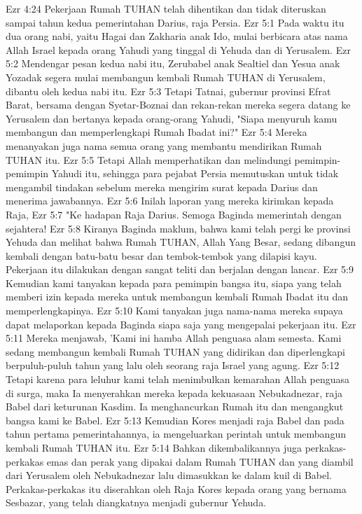 Ezr 4:24  Pekerjaan Rumah TUHAN telah dihentikan dan tidak diteruskan sampai tahun kedua pemerintahan Darius, raja Persia.
Ezr 5:1  Pada waktu itu dua orang nabi, yaitu Hagai dan Zakharia anak Ido, mulai berbicara atas nama Allah Israel kepada orang Yahudi yang tinggal di Yehuda dan di Yerusalem.
Ezr 5:2  Mendengar pesan kedua nabi itu, Zerubabel anak Sealtiel dan Yesua anak Yozadak segera mulai membangun kembali Rumah TUHAN di Yerusalem, dibantu oleh kedua nabi itu.
Ezr 5:3  Tetapi Tatnai, gubernur provinsi Efrat Barat, bersama dengan Syetar-Boznai dan rekan-rekan mereka segera datang ke Yerusalem dan bertanya kepada orang-orang Yahudi, "Siapa menyuruh kamu membangun dan memperlengkapi Rumah Ibadat ini?"
Ezr 5:4  Mereka menanyakan juga nama semua orang yang membantu mendirikan Rumah TUHAN itu.
Ezr 5:5  Tetapi Allah memperhatikan dan melindungi pemimpin-pemimpin Yahudi itu, sehingga para pejabat Persia memutuskan untuk tidak mengambil tindakan sebelum mereka mengirim surat kepada Darius dan menerima jawabannya.
Ezr 5:6  Inilah laporan yang mereka kirimkan kepada Raja,
Ezr 5:7  "Ke hadapan Raja Darius. Semoga Baginda memerintah dengan sejahtera!
Ezr 5:8  Kiranya Baginda maklum, bahwa kami telah pergi ke provinsi Yehuda dan melihat bahwa Rumah TUHAN, Allah Yang Besar, sedang dibangun kembali dengan batu-batu besar dan tembok-tembok yang dilapisi kayu. Pekerjaan itu dilakukan dengan sangat teliti dan berjalan dengan lancar.
Ezr 5:9  Kemudian kami tanyakan kepada para pemimpin bangsa itu, siapa yang telah memberi izin kepada mereka untuk membangun kembali Rumah Ibadat itu dan memperlengkapinya.
Ezr 5:10  Kami tanyakan juga nama-nama mereka supaya dapat melaporkan kepada Baginda siapa saja yang mengepalai pekerjaan itu.
Ezr 5:11  Mereka menjawab, 'Kami ini hamba Allah penguasa alam semesta. Kami sedang membangun kembali Rumah TUHAN yang didirikan dan diperlengkapi berpuluh-puluh tahun yang lalu oleh seorang raja Israel yang agung.
Ezr 5:12  Tetapi karena para leluhur kami telah menimbulkan kemarahan Allah penguasa di surga, maka Ia menyerahkan mereka kepada kekuasaan Nebukadnezar, raja Babel dari keturunan Kasdim. Ia menghancurkan Rumah itu dan mengangkut bangsa kami ke Babel.
Ezr 5:13  Kemudian Kores menjadi raja Babel dan pada tahun pertama pemerintahannya, ia mengeluarkan perintah untuk membangun kembali Rumah TUHAN itu.
Ezr 5:14  Bahkan dikembalikannya juga perkakas-perkakas emas dan perak yang dipakai dalam Rumah TUHAN dan yang diambil dari Yerusalem oleh Nebukadnezar lalu dimasukkan ke dalam kuil di Babel. Perkakas-perkakas itu diserahkan oleh Raja Kores kepada orang yang bernama Sesbazar, yang telah diangkatnya menjadi gubernur Yehuda.
